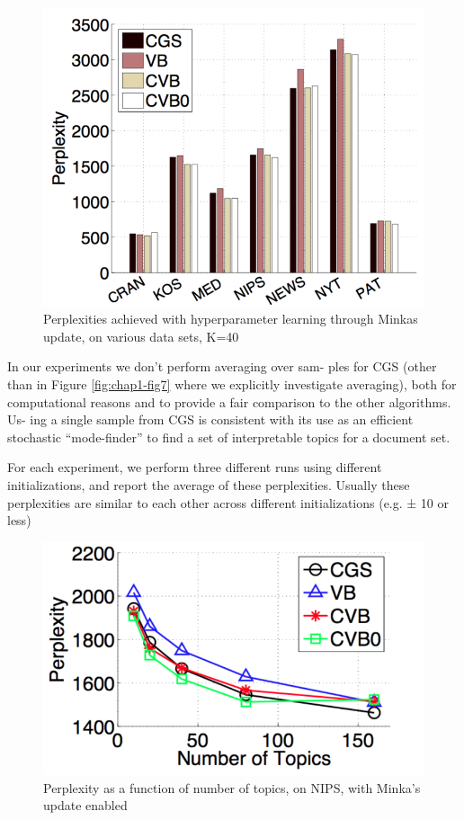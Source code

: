 \begin{figure}
  \centering
    \hspace*{-1.5cm}\includegraphics[height=0.33\textheight]{./Chap1/plots/figs/fig3.png}
  \caption{Perplexities achieved with hyperparameter learning through Minkas update, on various data sets, K=40}
  \label{fig:chap1-fig3}
\end{figure}


In our experiments we don’t perform averaging over sam- ples for CGS (other than in Figure \ref{fig:chap1-fig7} where we explicitly investigate averaging), both for computational reasons and to provide a fair comparison to the other algorithms. Us- ing a single sample from CGS is consistent with its use as an efficient stochastic “mode-finder” to find a set of interpretable topics for a document set.

For each experiment, we perform three different runs using different initializations, and report the average of these perplexities. Usually these perplexities are similar to each other across different initializations (e.g. ± 10 or less)


\begin{figure}
  \centering
    \hspace*{-1.5cm}\includegraphics[height=0.33\textheight]{./Chap1/plots/figs/fig4.png}
  \caption{Perplexity as a function of number of topics, on NIPS, with Minka’s update enabled}
  \label{fig:chap1-fig4}
\end{figure}



